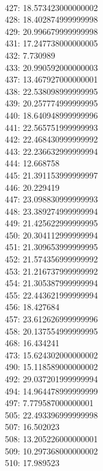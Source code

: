 \begin{multicols}{4}
  \\ 427: 18.573423000000002
  \\ 428: 18.402874999999998
  \\ 429: 20.996679999999998
  \\ 431: 17.247738000000005
  \\ 432: 7.730989
  \\ 433: 20.990592000000003
  \\ 437: 13.467927000000001
  \\ 438: 22.538098999999995
  \\ 439: 20.257774999999995
  \\ 440: 18.640948999999996
  \\ 441: 22.565751999999993
  \\ 442: 22.468430999999992
  \\ 443: 22.236632999999994
  \\ 444: 12.668758
  \\ 445: 21.391153999999997
  \\ 446: 20.229419
  \\ 447: 23.098830999999993
  \\ 448: 23.389274999999994
  \\ 449: 21.425622999999995
  \\ 450: 20.304112999999994
  \\ 451: 21.309653999999995
  \\ 452: 21.574356999999992
  \\ 453: 21.216737999999992
  \\ 454: 21.305387999999994
  \\ 455: 22.443621999999994
  \\ 456: 18.427684
  \\ 457: 23.612626999999996
  \\ 458: 20.137554999999995
  \\ 468: 16.434241
  \\ 473: 15.624302000000002
  \\ 490: 15.118589000000002
  \\ 492: 29.037201999999994
  \\ 494: 14.964478999999999
  \\ 497: 7.779587000000001
  \\ 505: 22.493396999999998
  \\ 507: 16.502023
  \\ 508: 13.205226000000001
  \\ 509: 10.297368000000002
  \\ 510: 17.989523

\end{multicols}
